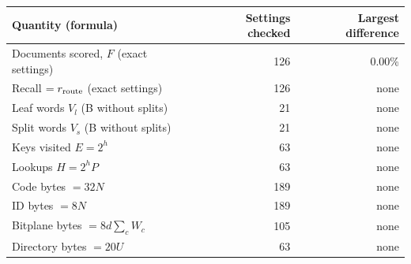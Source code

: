 \begin{tabular}{@{}lrr@{}}\toprule
Quantity (formula) & Settings checked & Largest difference\\\midrule
Documents scored, $F$ (exact settings) & 126 & 0.00\%\\
Recall $=r_{\rm route}$ (exact settings) & 126 & none\\
Leaf words $V_l$ (B without splits) & 21 & none\\
Split words $V_s$ (B without splits) & 21 & none\\
Keys visited $E=2^h$ & 63 & none\\
Lookups $H=2^hP$ & 63 & none\\
Code bytes $=32N$ & 189 & none\\
ID bytes $=8N$ & 189 & none\\
Bitplane bytes $=8d\sum_cW_c$ & 105 & none\\
Directory bytes $=20U$ & 63 & none\\
\bottomrule\end{tabular}
